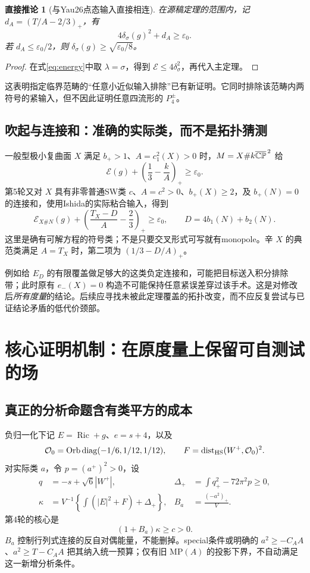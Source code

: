 \documentclass[UTF8,fontset=fandol,zihao=-4]{ctexart}
\theoremstyle{research}
\newtheorem{lemma}[sourceprop]{直接推论}
\DeclareMathOperator{\Ric}{Ric}\DeclareMathOperator{\Rm}{Rm}
\begin{document}
\begin{lemma}[与Yau26点态输入直接相连]
在源稿定理的范围内，记 $d_A=(T/A-2/3)_+$，有
\begin{equation}\label{eq:pointgap}
 4\delta_\sigma(g)^2+d_A\ge\varepsilon_0.
\end{equation}
若 $d_A\le\varepsilon_0/2$，则 $\delta_\sigma(g)\ge\sqrt{\varepsilon_0/8}$。
\end{lemma}
\begin{proof}
在式\eqref{eq:energy}中取 $\lambda=\sigma$，得到 $\mathcal E\le4\delta_\sigma^2$，再代入主定理。
\end{proof}
这表明指定临界范畴的“任意小近似输入排除”已有新证明。它同时排除该范畴内两符号的紧输入，但不因此证明任意四流形的 $P_4^\pm$。

\subsection{吹起与连接和：准确的实际类，而不是拓扑猜测}
一般型极小复曲面 $X$ 满足 $b_+>1$、$A=c_1^2(X)>0$ 时，$M=X\#k\overline{\mathbb{CP}}^{\,2}$ 给
\begin{equation}
 \mathcal E(g)+\left(\frac13-\frac{k}{A}\right)_+\ge\varepsilon_0.
\end{equation}
第5轮又对 $X$ 具有非零普通SW类 $c$、$A=c^2>0$、$b_+(X)\ge2$，及 $b_+(N)=0$ 的连接和，使用Ishida的实际粘合输入\cite{Ishida}，得到
\begin{equation}\label{eq:surgerygap}
 \mathcal E_{X\#N}(g)+
 \left(\frac{T_X-D}{A}-\frac23\right)_+\ge\varepsilon_0,
 \qquad D=4b_1(N)+b_2(N).
\end{equation}
这里是确有可解方程的符号类；不是只要交叉形式可写就有monopole。辛 $X$ 的典范类满足 $A=T_X$ 时，第二项为 $(1/3-D/A)_+$。

例如给 $E_D$ 的有限覆盖做足够大的这类负定连接和，可能把目标送入积分排除带；此时原有 $e_-(X)=0$ 构造不可能保持任意紧误差穿过该手术。这是对修改后\emph{所有度量}的结论。后续应寻找未被此定理覆盖的拓扑改变，而不应反复尝试与已证结论矛盾的低代价颈部。

\section{核心证明机制：在原度量上保留可自测试的场}
\subsection{真正的分析命题含有类平方的成本}
负归一化下记 $E=\Ric+g$、$e=s+4$，以及
\[
 \mathcal O_0=\operatorname{Orb}\operatorname{diag}(-1/6,1/12,1/12),\qquad
 F=\operatorname{dist}_{\rm HS}(W^+,\mathcal O_0)^2.
\]
对实际类 $a$，令 $p=(a^+)^2>0$，设
\begin{align}
 q&=-s+\sqrt6|W^+|,& \Delta_+&=\int q_+^2-72\pi^2p\ge0,\\
 \kappa&=V^{-1}\left\{\int(|E|^2+F)+\Delta_+\right\},&
 B_a&=\frac{(-a^2)_+}{V}.
\end{align}
第4轮的核心是
\begin{equation}\label{eq:analyticgap}
 \boxed{(1+B_a)\kappa\ge c>0.}
\end{equation}
$B_a$ 控制行列式连接的反自对偶能量，不能删掉。special条件或明确的 $a^2\ge-C_AA$、$a^2\ge T-C_AA$ 把其纳入统一预算；仅有旧 $\mathrm{MP}(A)$ 的投影下界，不自动满足这一新增分析条件。
\end{document}
